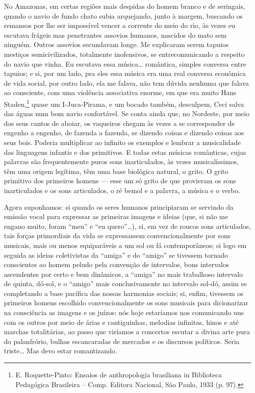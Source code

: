 No Amazonas, em certas regiões mais despidas do homem branco e de
seringais, quando o navio de fundo chato subia arquejando, junto à
margem, buscando os remansos por lhe ser impossível vencer a corrente do
meio do rio, às vezes eu escutava frágeis mas penetrantes assovios
humanos, nascidos do mato sem ninguém. Outros assovios secundavam longe.
Me explicaram serem tapuios mestiços semicivilizados, totalmente
inofensivos, se entrecomunicando a respeito do navio que vinha. Eu
escutava essa música\ldots{} romântica, simples conversa entre tapuios; e si,
por um lado, pra eles essa música era uma real conversa econômica de
vida social, por outro lado, ela me falava, não tem dúvida nenhuma que
falava ao consciente, com uma violência associativa enorme, em que era
muito Hans Staden,\footnote{E. Roquette-Pinto: Ensaios de anthropologia brasiliana in Biblioteca Pedagógica Brasileira -- Comp. Editora Nacional, São Paulo, 1933 (p.
97).} quase um I-Juca-Pirama, e um bocado também,
desculpem, Ceci salva das águas num bom navio confortável. Se conta
ainda que, no Nordeste, por meio dos seus cantos de aboiar, os vaqueiros
chegam às vezes a se corresponder de engenho a engenho, de fazenda a
fazenda, se dizendo coisas e dizendo coisas aos seus bois. Poderia
multiplicar ao infinito os exemplos e lembrar a musicalidade das
linguagens infantis e dos primitivos. E todas estas músicas românticas,
cujas palavras são frequentemente puros sons inarticulados, às vezes
musicalíssimos, têm uma origem legítima, têm uma base biológica natural,
o grito. O grito primitivo dos primeiros homens --- esse um só grito de
que provieram os sons inarticulados e os sons articulados, o ré bemol e
a palavra, a música e o verbo.

Agora suponhamos: si quando os seres humanos principiaram se servindo da
emissão vocal para expressar as primeiras imagens e ideias (que, si não
me engano muito, foram ``meu'' e ``eu quero''\ldots{}), si, em vez de roucos
sons articulados, tais forças primordiais da vida se expressassem
convencionalmente por sons musicais, mais ou menos equiparáveis a um sol
ou fá contemporâneos; si logo em seguida as ideias coletivistas da
``amiga'' e do ``amigo'' se tivessem tornado conscientes ao homem peludo
pela convenção de intervalos, bons intervalos ascendentes por certo e
bem dinâmicos, a ``amiga'' no mais trabalhoso intervalo de quinta,
dó-sol, e o ``amigo'' mais conclusivamente no intervalo sol-dó, assim se
completando a base pacífica das nossas harmonias sociais; si, enfim,
tivessem os primeiros homens escolhido convencionalmente os sons
musicais para dicionarizar na consciência as imagens e os juízos: nós
hoje estaríamos nos comunicando uns com os outros por meio de árias e
cantiguinhas, melodias infinitas, hinos e até marchas totalitárias, ao
passo que viríamos a concertos escutar a divina arte pura do
palanfrório, bulhas escancaradas de mercados e os discursos políticos.
Seria triste\ldots{} Mas devo estar romantizando.

